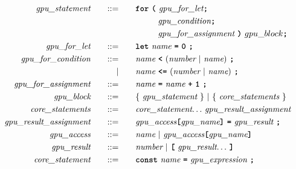 \begin{alignat*}{9}
    && \textit{gpu\_statement} 
    &&\quad ::= &\quad 
    && \textbf{\texttt{for}}\ \textbf{\texttt{(}} 
                              \ \textit{gpu\_for\_let} \textbf{\texttt{;}} \\
    &&  &&     &\quad && \ \ \ \ \ \ \ \  \textit{gpu\_condition} \textbf{\texttt{;}} \\
    &&  &&     &\quad && \ \ \ \ \ \ \ \  \textit{gpu\_for\_assignment} \ \textbf{\texttt{)}}  \ gpu\_block \textbf{\texttt{;}} \\
    && \textit{gpu\_for\_let} 
    &&\quad ::= &\quad 
    && \textbf{\texttt{let}}\  \textit{name} \ 
                                               \textbf{\texttt{=}}\  \textbf{\texttt{0}} \ \textbf{\texttt{;}} \\
    && \textit{gpu\_for\_condition} 
    &&\quad ::= &\quad 
    && \textit{name} \ 
    \textbf{\texttt{<}}\  (\textit{number} \ | \ \textit{name})\ \textbf{\texttt{;}} \\
    &&  && |    &\quad && \textit{name} \ \textbf{\texttt{<=}}\  (\textit{number} \ | \ \textit{name})\ \textbf{\texttt{;}} \\
    && \textit{gpu\_for\_assignment} 
    &&\quad ::= &\quad 
    && \textit{name} \ \textbf{\texttt{=}}\  \textit{name} \  \textbf{\texttt{+}} \ \textbf{\texttt{1}} \  \textbf{\texttt{;}} \\
    && \textit{gpu\_block} 
    &&\quad ::= &\quad 
    && \{ \ \textit{gpu\_statement} \ \} \ | \ \{ \ \textit{core\_statements} \ \} \\
    && \textit{core\_statements} 
    &&\quad ::= &\quad 
    && \textit{core\_statement} {\ldots} \ \textit{gpu\_result\_assignment} \\
    && \textit{gpu\_result\_assignment} 
    &&\quad ::= &\quad 
    && \textit{gpu\_access} \textbf{\texttt{[}} \textit{gpu\_name} \textbf{\texttt{]}}\ \textbf{\texttt{=}}\  \textit{gpu\_result} \ \textbf{\texttt{;}} \\
    && \textit{gpu\_access} 
    &&\quad ::= &\quad && \textit{name} \ | \
    \textit{gpu\_access} \textbf{\texttt{[}} \textit{gpu\_name} \textbf{\texttt{]}}\ \\
    && \textit{gpu\_result} 
    &&\quad ::= &\quad && \textit{number} \ | \
    \textbf{\texttt{[}}\ \textit{gpu\_result} {\ldots}\ \textbf{\texttt{]}}\ \\
    && \textit{core\_statement} 
    &&\quad ::= &\quad 
    && \textbf{\texttt{const}}\  \textit{name} \ 
        \textbf{\texttt{=}}\  \textit{gpu\_expression} \ \textbf{\texttt{;}} \\

\end{alignat*}
